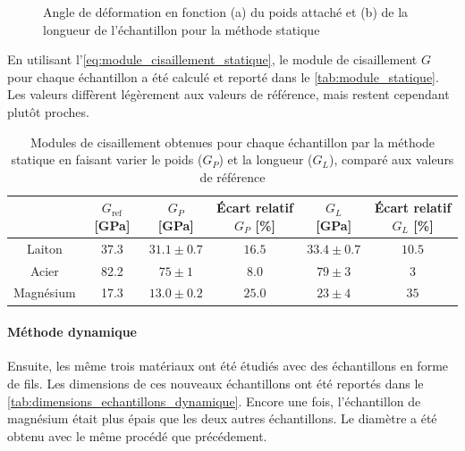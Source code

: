 \begin{figure}[h]
\begin{subfigure}{0.45\linewidth}
        \caption{}
        \label{fig:statique_longueur}
    \end{subfigure}
    \caption{Angle de déformation en fonction (a) du poids attaché et (b) de la longueur de l'échantillon pour la méthode statique}
\end{figure}

En utilisant l'\autoref{eq:module_cisaillement_statique}, le module de cisaillement $G$ pour chaque échantillon a été calculé et reporté dans le \autoref{tab:module_statique}. Les valeurs diffèrent légèrement aux valeurs de référence, mais restent cependant plutôt proches.

\begin{table}[h]
    \centering
    \begin{tabulary}{\linewidth}{c c c c c c}
        \toprule
        & $G_\textrm{ref}$ [\si{\giga\pascal}] & $G_P$ [\si{\giga\pascal}] & Écart relatif $G_P$ [\%] & $G_L$ [\si{\giga\pascal}] & Écart relatif $G_L$ [\%] \\
        \midrule
        Laiton & 37.3 & $31.1\pm0.7$ & $16.5$ & $33.4\pm0.7$ & $10.5$ \\
        Acier & 82.2 & $75\pm1$ & $8.0$ & $79\pm3$ & $3$ \\
        Magnésium & 17.3 & $13.0\pm0.2$ & $25.0$ & $23\pm4$ & $35$ \\
        \bottomrule
    \end{tabulary}
    \caption{Modules de cisaillement obtenues pour chaque échantillon par la méthode statique en faisant varier le poids ($G_P$) et la longueur ($G_L$), comparé aux valeurs de référence}
    \label{tab:module_statique}
\end{table}

\paragraph{Méthode dynamique}
Ensuite, les même trois matériaux ont été étudiés avec des échantillons en forme de fils. Les dimensions de ces nouveaux échantillons ont été reportés dans le \autoref{tab:dimensions_echantillons_dynamique}. Encore une fois, l'échantillon de magnésium était plus épais que les deux autres échantillons. Le diamètre a été obtenu avec le même procédé que précédement.

